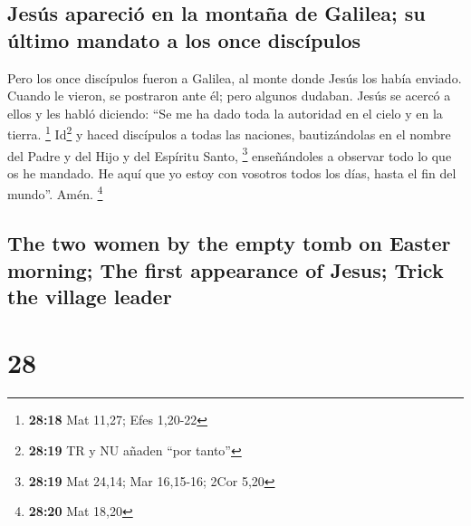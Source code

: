 \begin{paracol}{2}
\hypertarget{jesuxfas-apareciuxf3-en-la-montauxf1a-de-galilea-su-uxfaltimo-mandato-a-los-once-discuxedpulos}{%
\subsection{Jesús apareció en la montaña de Galilea; su último mandato a
los once
discípulos}\label{jesuxfas-apareciuxf3-en-la-montauxf1a-de-galilea-su-uxfaltimo-mandato-a-los-once-discuxedpulos}}

 Pero los once discípulos fueron a Galilea, al monte
donde Jesús los había enviado.  Cuando le vieron, se
postraron ante él; pero algunos dudaban.  Jesús se acercó
a ellos y les habló diciendo: ``Se me ha dado toda la autoridad en el
cielo y en la tierra. \footnote{\textbf{28:18} Mat 11,27; Efes 1,20-22}
 Id\footnote{\textbf{28:19} TR y NU añaden ``por tanto''}
y haced discípulos a todas las naciones, bautizándolas en el nombre del
Padre y del Hijo y del Espíritu Santo, \footnote{\textbf{28:19} Mat
  24,14; Mar 16,15-16; 2Cor 5,20}  enseñándoles a
observar todo lo que os he mandado. He aquí que yo estoy con vosotros
todos los días, hasta el fin del mundo''. Amén. \footnote{\textbf{28:20}
  Mat 18,20} \switchcolumn \begin{otherlanguage}{english}

\hypertarget{the-two-women-by-the-empty-tomb-on-easter-morning-the-first-appearance-of-jesus-trick-the-village-leader}{%
\subsection{The two women by the empty tomb on Easter morning; The first
appearance of Jesus; Trick the village
leader}\label{the-two-women-by-the-empty-tomb-on-easter-morning-the-first-appearance-of-jesus-trick-the-village-leader}}

\hypertarget{section-55}{%
\section{28}\label{section-55}}


\end{otherlanguage}
\end{paracol}
